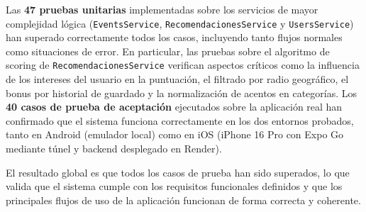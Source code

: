 Las \textbf{47 pruebas unitarias} implementadas sobre los servicios de mayor complejidad lógica (\texttt{EventsService}, \texttt{RecomendacionesService} y \texttt{UsersService}) han superado correctamente todos los casos, incluyendo tanto flujos normales como situaciones de error. En particular, las pruebas sobre el algoritmo de scoring de \texttt{RecomendacionesService} verifican aspectos críticos como la influencia de los intereses del usuario en la puntuación, el filtrado por radio geográfico, el bonus por historial de guardado y la normalización de acentos en categorías. Los \textbf{40 casos de prueba de aceptación} ejecutados sobre la aplicación real han confirmado que el sistema funciona correctamente en los dos entornos probados, tanto en Android (emulador local) como en iOS (iPhone 16 Pro con Expo Go mediante túnel y backend desplegado en Render).

El resultado global es que todos los casos de prueba han sido superados, lo que valida que el sistema cumple con los requisitos funcionales definidos y que los principales flujos de uso de la aplicación funcionan de forma correcta y coherente.
